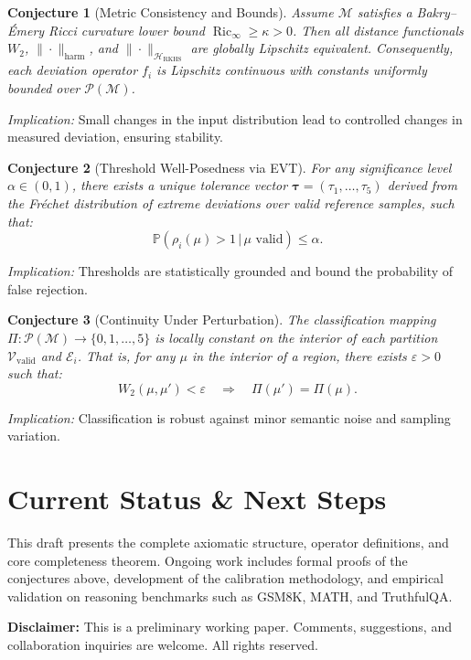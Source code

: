 \documentclass[11pt,a4paper]{article}
\theoremstyle{plain}
\newtheorem{conjecture}{Conjecture}[section]
\begin{document}
	\begin{conjecture}[Metric Consistency and Bounds]
		Assume $\mathcal{M}$ satisfies a Bakry–Émery Ricci curvature lower bound $\operatorname{Ric}_\infty \ge \kappa > 0$. Then all distance functionals $W_2$, $\|\cdot\|_{\text{harm}}$, and $\|\cdot\|_{\mathcal{H}_{\text{RKHS}}}$ are globally Lipschitz equivalent. Consequently, each deviation operator $f_i$ is Lipschitz continuous with constants uniformly bounded over $\mathcal{P}(\mathcal{M})$.
	\end{conjecture}
	\noindent\textit{Implication:} Small changes in the input distribution lead to controlled changes in measured deviation, ensuring stability.
	
	\begin{conjecture}[Threshold Well-Posedness via EVT]
		For any significance level $\alpha \in (0,1)$, there exists a unique tolerance vector $\boldsymbol{\tau} = (\tau_1, \dots, \tau_5)$ derived from the Fréchet distribution of extreme deviations over valid reference samples, such that:
		\[
		\mathbb{P}\left( \rho_i(\mu) > 1 \,\big|\, \mu \text{ valid} \right) \le \alpha.
		\]
	\end{conjecture}
	\noindent\textit{Implication:} Thresholds are statistically grounded and bound the probability of false rejection.
	
	\begin{conjecture}[Continuity Under Perturbation]
		The classification mapping $\Pi: \mathcal{P}(\mathcal{M}) \to \{0,1,\dots,5\}$ is locally constant on the interior of each partition $\mathcal{V}_{\text{valid}}$ and $\mathcal{E}_i$. That is, for any $\mu$ in the interior of a region, there exists $\varepsilon > 0$ such that:
		\[
		W_2(\mu, \mu') < \varepsilon \quad \Rightarrow \quad \Pi(\mu') = \Pi(\mu).
		\]
	\end{conjecture}
	\noindent\textit{Implication:} Classification is robust against minor semantic noise and sampling variation.
	
	\section{Current Status \& Next Steps}
	
	This draft presents the complete axiomatic structure, operator definitions, and core completeness theorem. Ongoing work includes formal proofs of the conjectures above, development of the calibration methodology, and empirical validation on reasoning benchmarks such as GSM8K, MATH, and TruthfulQA.
	
	\vspace{1em}
	\noindent\textbf{Disclaimer:} This is a preliminary working paper. Comments, suggestions, and collaboration inquiries are welcome. All rights reserved.
	
\end{document}
